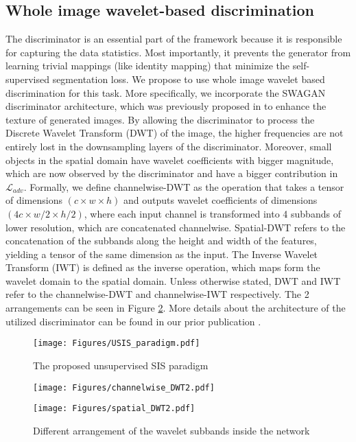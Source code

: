 \documentclass{article}
\begin{document}
\subsection{Whole image wavelet-based discrimination}
The discriminator is an essential part of the framework because it is responsible for capturing the data statistics. Most importantly, it prevents the generator from learning trivial mappings (like identity mapping) that minimize the self-supervised segmentation loss. We propose to use whole image wavelet based discrimination for this task. More specifically, we incorporate the SWAGAN discriminator architecture, which was previously proposed in \cite{Gal2021SWAGANAS} to enhance the texture of generated images. By allowing the discriminator to process the Discrete Wavelet Transform (DWT) of the image, the higher frequencies are not entirely lost in the downsampling layers of the discriminator. Moreover, small objects in the spatial domain have wavelet coefficients with bigger magnitude, which are now observed by the discriminator and have a bigger contribution in $\mathcal{L}_{adv}$.
Formally, we define channelwise-DWT as the operation that takes a tensor of dimensions $(c \times w \times h)$ and outputs wavelet coefficients of dimensions $(4c \times w/2 \times h/2)$, where each input channel is transformed into 4 subbands of lower resolution, which are concatenated channelwise. Spatial-DWT refers to the concatenation of the subbands along the height and width of the features, yielding a tensor of the same dimension as the input. The Inverse Wavelet Transform (IWT) is defined as the inverse operation, which maps form the wavelet domain to the spatial domain. Unless otherwise stated, DWT and IWT refer to the channelwise-DWT and channelwise-IWT respectively. The 2 arrangements can be seen in Figure \ref{fig:DWT}. More details about the architecture of the utilized discriminator can be found in our prior publication \cite{eskandar2021usis}.
\begin{figure}
    \centering
    \begin{minipage}{\linewidth}
    \texttt{[image: Figures/USIS\_paradigm.pdf]}
    \end{minipage}
    \caption{The proposed unsupervised SIS paradigm}
    \label{fig:semantic_consistency}
\end{figure}
 \begin{figure}[t]
    \centering
    \begin{minipage}{0.4\linewidth}
    \centering
    \texttt{[image: Figures/channelwise\_DWT2.pdf]}
    \label{fig:DWT:channel}
    \end{minipage}
    \qquad
    \begin{minipage}{0.4\linewidth}
    \centering
    \texttt{[image: Figures/spatial\_DWT2.pdf]}
    \label{fig:DWT:spatial}
    \end{minipage}
    \caption{Different arrangement of the wavelet subbands inside the network}
    \vspace{-2em}
    \label{fig:DWT}
\end{figure}
\end{document}
